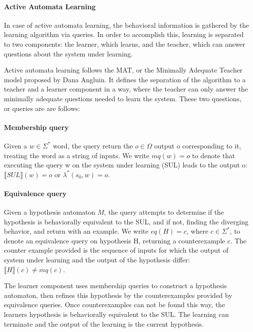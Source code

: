 \paragraph{Active Automata Learning} In case of active automata learning, the behavioral information is gathered by the learning algorithm via queries. In order to accomplish this, learning is separated to two components: the learner, which learns, and the teacher, which can answer questions about the system under learning.


Active automata learning follows the MAT, or the Minimally Adequate Teacher model proposed by Dana Angluin\cite{ANGLUIN198787}. It defines the separation of the algorithm to a teacher and a learner component in a way, where the teacher can only answer the minimally adequate questions needed to learn the system. These two questions, or queries are are follows:


\paragraph{Membership query} Given a $w\in\Sigma^{*}$ word, the query return the $o\in \Omega$ output o corresponding to it, treating the word as a string of inputs. We write $mq(w) = o$ to denote that executing the query w on the system under learning (SUL) leads to the output o: $\llbracket SUL \rrbracket(w) = o$ or $\lambda^*(s_0, w) = o$.

\paragraph{Equivalence query} Given a hypothesis automaton $M$, the query attempts to determine if the hypothesis is behaviorally equivalent to the SUL, and if not, finding the diverging behavior, and return with an example. We write $eq(H) = c$, where $c\in\Sigma^*$, to denote an equivalence query on hypothesis H, returning a counterexample c. The counter example provided is the sequence of inputs for which the output of system under learning and the output of the hypothesis differ: $ \llbracket H\rrbracket(c) \neq mq(c)$.

\noindent The learner component uses membership queries to construct a hypothesis automaton, then refines this hypothesis by the counterexamples provided by equivalence queries. Once counterexamples can not be found this way, the learners hypothesis is behaviorally equivalent to the SUL. The learning can terminate and the output of the learning is the current hypothesis.

